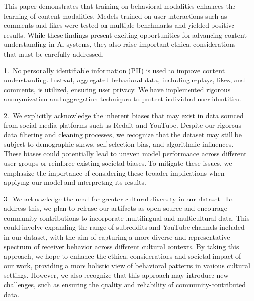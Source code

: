 This paper demonstrates that training on behavioral modalities enhances the learning of content modalities. Models trained on user interactions such as comments and likes were tested on multiple benchmarks and yielded positive results. While these findings present exciting opportunities for advancing content understanding in AI systems, they also raise important ethical considerations that must be carefully addressed.

1.~No personally identifiable information (PII) is used to improve content understanding. Instead, aggregated behavioral data, including replays, likes, and comments, is utilized, ensuring user privacy. We have implemented rigorous anonymization and aggregation techniques to protect individual user identities. 

2.~We explicitly acknowledge the inherent biases that may exist in data sourced from social media platforms such as Reddit and YouTube. Despite our rigorous data filtering and cleaning processes, we recognize that the dataset may still be subject to demographic skews, self-selection bias, and algorithmic influences. These biases could potentially lead to uneven model performance across different user groups or reinforce existing societal biases.
To mitigate these issues, we emphasize the importance of considering these broader implications when applying our model and interpreting its results. 


3.~We acknowledge the need for greater cultural diversity in our dataset. To address this, we plan to release our artifacts as open-source and encourage community contributions to incorporate multilingual and multicultural data. This could involve expanding the range of subreddits and YouTube channels included in our dataset, with the aim of capturing a more diverse and representative spectrum of receiver behavior across different cultural contexts.
By taking this approach, we hope to enhance the ethical considerations and societal impact of our work, providing a more holistic view of behavioral patterns in various cultural settings. However, we also recognize that this approach may introduce new challenges, such as ensuring the quality and reliability of community-contributed data.

